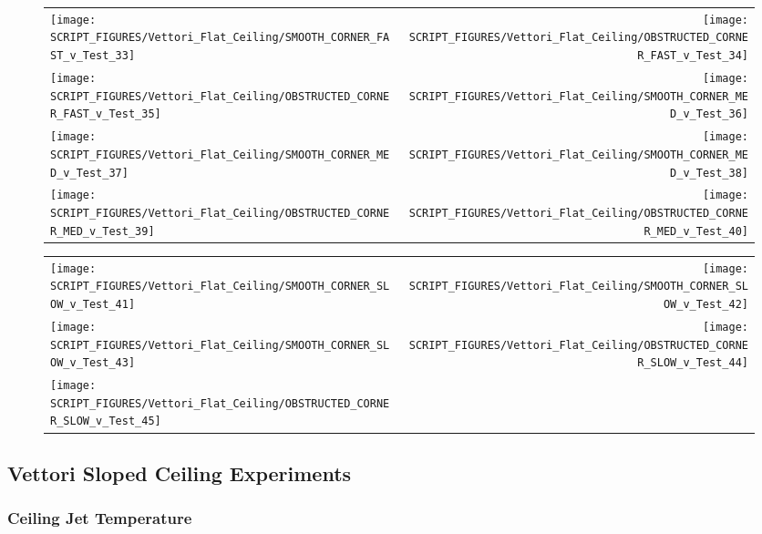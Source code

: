 \begin{figure}[!ht]
\begin{tabular*}{\textwidth}{l@{\extracolsep{\fill}}r}
\texttt{[image: SCRIPT\_FIGURES/Vettori\_Flat\_Ceiling/SMOOTH\_CORNER\_FAST\_v\_Test\_33]} &
\texttt{[image: SCRIPT\_FIGURES/Vettori\_Flat\_Ceiling/OBSTRUCTED\_CORNER\_FAST\_v\_Test\_34]} \\
\texttt{[image: SCRIPT\_FIGURES/Vettori\_Flat\_Ceiling/OBSTRUCTED\_CORNER\_FAST\_v\_Test\_35]} &
\texttt{[image: SCRIPT\_FIGURES/Vettori\_Flat\_Ceiling/SMOOTH\_CORNER\_MED\_v\_Test\_36]} \\
\texttt{[image: SCRIPT\_FIGURES/Vettori\_Flat\_Ceiling/SMOOTH\_CORNER\_MED\_v\_Test\_37]} &
\texttt{[image: SCRIPT\_FIGURES/Vettori\_Flat\_Ceiling/SMOOTH\_CORNER\_MED\_v\_Test\_38]} \\
\texttt{[image: SCRIPT\_FIGURES/Vettori\_Flat\_Ceiling/OBSTRUCTED\_CORNER\_MED\_v\_Test\_39]} &
\texttt{[image: SCRIPT\_FIGURES/Vettori\_Flat\_Ceiling/OBSTRUCTED\_CORNER\_MED\_v\_Test\_40]} \\
\end{tabular*}
\label{Vettori_5}
\end{figure}

\begin{figure}[!ht]
\begin{tabular*}{\textwidth}{l@{\extracolsep{\fill}}r}
\texttt{[image: SCRIPT\_FIGURES/Vettori\_Flat\_Ceiling/SMOOTH\_CORNER\_SLOW\_v\_Test\_41]} &
\texttt{[image: SCRIPT\_FIGURES/Vettori\_Flat\_Ceiling/SMOOTH\_CORNER\_SLOW\_v\_Test\_42]} \\
\texttt{[image: SCRIPT\_FIGURES/Vettori\_Flat\_Ceiling/SMOOTH\_CORNER\_SLOW\_v\_Test\_43]} &
\texttt{[image: SCRIPT\_FIGURES/Vettori\_Flat\_Ceiling/OBSTRUCTED\_CORNER\_SLOW\_v\_Test\_44]} \\
\texttt{[image: SCRIPT\_FIGURES/Vettori\_Flat\_Ceiling/OBSTRUCTED\_CORNER\_SLOW\_v\_Test\_45]} \\
\end{tabular*}
\label{Vettori_6}
\end{figure}

\clearpage

\subsection{Vettori Sloped Ceiling Experiments}

\subsubsection{Ceiling Jet Temperature}

